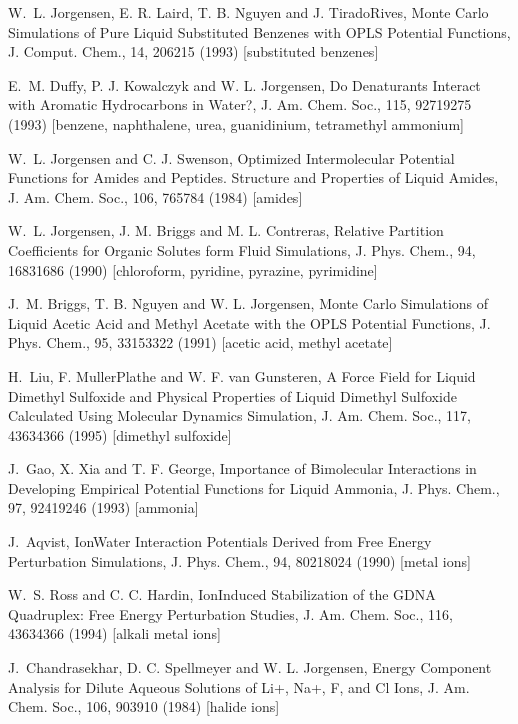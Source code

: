 \documentclass[letterpaper,11pt,english]{sphinxmanual}
\begin{document}
\sphinxAtStartPar
W. L. Jorgensen, E. R. Laird, T. B. Nguyen and J. Tirado\sphinxhyphen{}Rives, Monte Carlo Simulations of Pure Liquid Substituted Benzenes with OPLS Potential Functions, J. Comput. Chem., 14, 206\sphinxhyphen{}215 (1993)  {[}substituted benzenes{]}

\sphinxAtStartPar
E. M. Duffy, P. J. Kowalczyk and W. L. Jorgensen, Do Denaturants Interact with Aromatic Hydrocarbons in Water?, J. Am. Chem. Soc., 115, 9271\sphinxhyphen{}9275 (1993)  {[}benzene, naphthalene, urea, guanidinium, tetramethyl ammonium{]}

\sphinxAtStartPar
W. L. Jorgensen and C. J. Swenson, Optimized Intermolecular Potential Functions for Amides and Peptides. Structure and Properties of Liquid Amides, J. Am. Chem. Soc., 106, 765\sphinxhyphen{}784 (1984)  {[}amides{]}

\sphinxAtStartPar
W. L. Jorgensen, J. M. Briggs and M. L. Contreras, Relative Partition Coefficients for Organic Solutes form Fluid Simulations, J. Phys. Chem., 94, 1683\sphinxhyphen{}1686 (1990)  {[}chloroform, pyridine, pyrazine, pyrimidine{]}

\sphinxAtStartPar
J. M. Briggs, T. B. Nguyen and W. L. Jorgensen, Monte Carlo Simulations of Liquid Acetic Acid and Methyl Acetate with the OPLS Potential Functions, J. Phys. Chem., 95, 3315\sphinxhyphen{}3322 (1991)  {[}acetic acid, methyl acetate{]}

\sphinxAtStartPar
H. Liu, F. Muller\sphinxhyphen{}Plathe and W. F. van Gunsteren, A Force Field for Liquid Dimethyl Sulfoxide and Physical Properties of Liquid Dimethyl Sulfoxide Calculated Using Molecular Dynamics Simulation, J. Am. Chem. Soc., 117, 4363\sphinxhyphen{}4366 (1995)  {[}dimethyl sulfoxide{]}

\sphinxAtStartPar
J. Gao, X. Xia and T. F. George, Importance of Bimolecular Interactions in Developing Empirical Potential Functions for Liquid Ammonia, J. Phys. Chem., 97, 9241\sphinxhyphen{}9246 (1993)  {[}ammonia{]}

\sphinxAtStartPar
J. Aqvist, Ion\sphinxhyphen{}Water Interaction Potentials Derived from Free Energy Perturbation Simulations, J. Phys. Chem., 94, 8021\sphinxhyphen{}8024 (1990)  {[}metal ions{]}

\sphinxAtStartPar
W. S. Ross and C. C. Hardin, Ion\sphinxhyphen{}Induced Stabilization of the G\sphinxhyphen{}DNA Quadruplex: Free Energy Perturbation Studies, J. Am. Chem. Soc., 116, 4363\sphinxhyphen{}4366 (1994)  {[}alkali metal ions{]}

\sphinxAtStartPar
J. Chandrasekhar, D. C. Spellmeyer and W. L. Jorgensen, Energy Component Analysis for Dilute Aqueous Solutions of Li+, Na+, F\sphinxhyphen{}, and Cl\sphinxhyphen{} Ions, J. Am. Chem. Soc., 106, 903\sphinxhyphen{}910 (1984)  {[}halide ions{]}
\end{document}

